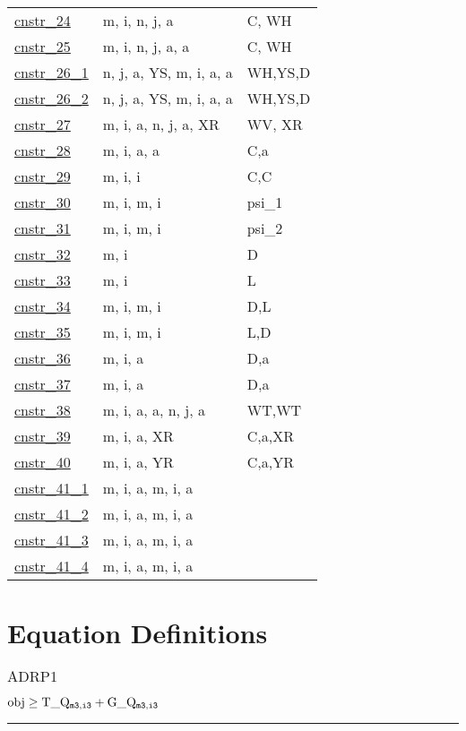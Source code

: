 \documentclass[11pt]{article}
\begin{document}
\begin{tabularx}{\textwidth}{| l | l | X |}
\hyperref[cnstr_24]{cnstr\_24}  & m, i, n, j, a & C, WH \\ 
\hyperref[cnstr_25]{cnstr\_25}  & m, i, n, j, a, a & C, WH \\ 
\hyperref[cnstr_26_1]{cnstr\_26\_1}  & n, j, a, YS, m, i, a, a & WH,YS,D \\ 
\hyperref[cnstr_26_2]{cnstr\_26\_2}  & n, j, a, YS, m, i, a, a & WH,YS,D \\ 
\hyperref[cnstr_27]{cnstr\_27}  & m, i, a, n, j, a, XR & WV, XR \\ 
\hyperref[cnstr_28]{cnstr\_28}  & m, i, a, a & C,a \\ 
\hyperref[cnstr_29]{cnstr\_29}  & m, i, i & C,C \\ 
\hyperref[cnstr_30]{cnstr\_30}  & m, i, m, i & psi\_1 \\ 
\hyperref[cnstr_31]{cnstr\_31}  & m, i, m, i & psi\_2 \\ 
\hyperref[cnstr_32]{cnstr\_32}  & m, i & D \\ 
\hyperref[cnstr_33]{cnstr\_33}  & m, i & L \\ 
\hyperref[cnstr_34]{cnstr\_34}  & m, i, m, i & D,L \\ 
\hyperref[cnstr_35]{cnstr\_35}  & m, i, m, i & L,D \\ 
\hyperref[cnstr_36]{cnstr\_36}  & m, i, a & D,a \\ 
\hyperref[cnstr_37]{cnstr\_37}  & m, i, a & D,a \\ 
\hyperref[cnstr_38]{cnstr\_38}  & m, i, a, a, n, j, a & WT,WT \\ 
\hyperref[cnstr_39]{cnstr\_39}  & m, i, a, XR & C,a,XR \\ 
\hyperref[cnstr_40]{cnstr\_40}  & m, i, a, YR & C,a,YR \\ 
\hyperref[cnstr_41_1]{cnstr\_41\_1}  & m, i, a, m, i, a &  \\ 
\hyperref[cnstr_41_2]{cnstr\_41\_2}  & m, i, a, m, i, a &  \\ 
\hyperref[cnstr_41_3]{cnstr\_41\_3}  & m, i, a, m, i, a &  \\ 
\hyperref[cnstr_41_4]{cnstr\_41\_4}  & m, i, a, m, i, a &  \\ 
\hline 
\end{tabularx}
\section*{Equation Definitions}
\subsubsection*{$\text{ADRP1}$} \label{ADRP1}
$
\textcolor{black}{\text{obj}} \geq \textcolor{black}{\text{T\_Q}}_{\texttt{m3}, \texttt{i3}} + \textcolor{black}{\text{G\_Q}}_{\texttt{m3}, \texttt{i3}}
$ \vspace{5pt}
\hrule 
\end{document}
